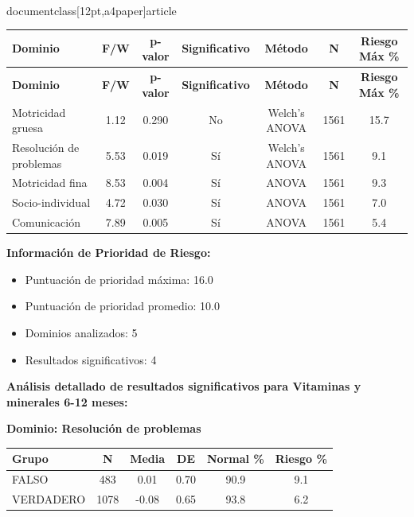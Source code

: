 \\documentclass[12pt,a4paper]{article}
\begin{document}
\begin{longtable}{|l|c|c|c|c|c|c|}
\hline
\textbf{Dominio} & \textbf{F/W} & \textbf{p-valor} & \textbf{Significativo} & \textbf{Método} & \textbf{N} & \textbf{Riesgo Máx \%} \\
\hline
\endfirsthead

\hline
\textbf{Dominio} & \textbf{F/W} & \textbf{p-valor} & \textbf{Significativo} & \textbf{Método} & \textbf{N} & \textbf{Riesgo Máx \%} \\
\hline
\endhead

\hline
\endfoot

\hline
\endlastfoot

Motricidad gruesa & 1.12 & 0.290 & No & Welch's ANOVA & 1561 & 15.7 \\
Resolución de problemas & 5.53 & 0.019 & Sí & Welch's ANOVA & 1561 & 9.1 \\
Motricidad fina & 8.53 & 0.004 & Sí & ANOVA & 1561 & 9.3 \\
Socio-individual & 4.72 & 0.030 & Sí & ANOVA & 1561 & 7.0 \\
Comunicación & 7.89 & 0.005 & Sí & ANOVA & 1561 & 5.4 \\

\end{longtable}


\textbf{Información de Prioridad de Riesgo:}
\begin{itemize}
\item Puntuación de prioridad máxima: 16.0
\item Puntuación de prioridad promedio: 10.0
\item Dominios analizados: 5
\item Resultados significativos: 4
\end{itemize}


\textbf{Análisis detallado de resultados significativos para Vitaminas y minerales 6-12 meses:}


\textbf{Dominio: Resolución de problemas}


\begin{center}
\begin{tabular}{|l|c|c|c|c|c|}
\hline
\textbf{Grupo} & \textbf{N} & \textbf{Media} & \textbf{DE} & \textbf{Normal \%} & \textbf{Riesgo \%} \\
\hline
FALSO & 483 & 0.01 & 0.70 & 90.9 & 9.1 \\
VERDADERO & 1078 & -0.08 & 0.65 & 93.8 & 6.2 \\

\hline
\end{tabular}
\end{center}
\end{document}
